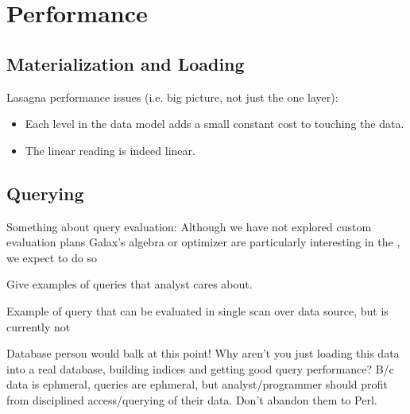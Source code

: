 \section{Performance}
\label{section:performance}



\subsection{Materialization and Loading}

Lasagna performance issues (i.e. big picture, not just the one layer):

\begin{itemize}
\item Each level in the data model adds a small constant cost to
  touching the data.
\item The linear reading is indeed linear.
\end{itemize}

\subsection{Querying}

Something about query evaluation:
Although we have not explored custom evaluation plans 
Galax's algebra or optimizer are particularly interesting in the 
\padx{}, we expect to do so 

Give examples of queries that analyst cares about. 

Example of query that can be evaluated in single scan over data
source, but is currently not 

Database person would balk at this point!  Why aren't you just loading
this data into a real database, building indices and getting good
query performance?  B/c data is ephmeral, queries are ephmeral, but
analyst/programmer should profit from disciplined access/querying of
their data.  Don't abandon them to Perl. 

